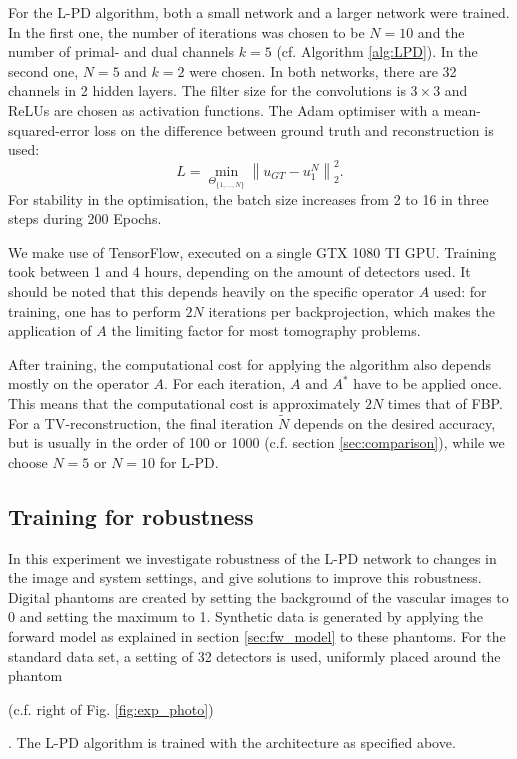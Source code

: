 \documentclass[journal]{IEEEtran}
\newcommand{\norm}[1]{\left\lVert#1\right\rVert}
\newcommand{\hl}[1]{\cbcolor{red}\begin{changebar}{\color{red} #1}\end{changebar}}
\begin{document}
For the L-PD algorithm, both a small network and a larger network were trained. In the first one, the number of iterations was chosen to be $N=10$ and the number of primal- and dual channels $k=5$ (cf. Algorithm \ref{alg:LPD}). In the second one, $N=5$ and $k=2$ were chosen. In both networks, there are 32 channels in 2 hidden layers. The filter size for the convolutions is $3\times3$ and ReLUs are chosen as activation functions. The Adam optimiser \cite{Kingma2015} with a mean-squared-error loss on the difference between ground truth and reconstruction is used: 
\begin{equation}\label{eq:Loss_1}
L=\min_{\Theta_{\{1,\dots,N\}}}\norm{u_{GT}-u_1^N}^2_2.
\end{equation}
For stability in the optimisation, the batch size increases from 2 to 16 in three steps \cite{Smith2017} during 200 Epochs. \hl{We make use of TensorFlow, executed on a single GTX 1080 TI GPU. Training took between 1 and 4 hours, depending on the amount of detectors used. It should be noted that this depends heavily on the specific operator $A$ used: for training, one has to perform $2N$ iterations per backprojection, which makes the application of $A$ the limiting factor for most tomography problems. 

After training, the computational cost for applying the algorithm also depends mostly on the operator $A$. For each iteration, $A$ and $A^*$ have to be applied once. This means that the computational cost is approximately $2N$ times that of FBP. For a TV-reconstruction, the final iteration $\tilde{N}$ depends on the desired accuracy, but is usually in the order of 100 or 1000 (c.f. section \ref{sec:comparison}), while we choose $N=5$ or $N=10$ for L-PD.}

\subsection{Training for robustness}\label{sec:robustness}
In this experiment we investigate robustness of the L-PD network to changes in the image and system settings, and give solutions to improve this robustness. Digital phantoms are created by setting the background of the vascular images to 0 and setting the maximum to 1. Synthetic data is generated by applying the forward model as explained in section \ref{sec:fw_model} to these phantoms. For the standard data set, a setting of 32 detectors is used, uniformly placed around the phantom \hl{(c.f. right of Fig. \ref{fig:exp_photo})}. The L-PD algorithm is trained with the architecture as specified above. 
\end{document}
